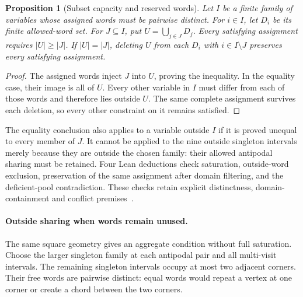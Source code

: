 \documentclass[11pt,a4paper]{article}
\newtheorem{proposition}[theorem]{Proposition}
\theoremstyle{definition}
\theoremstyle{remark}
\begin{document}
\begin{proposition}[Subset capacity and reserved words]\label{prop:subset211}
Let $I$ be a finite family of variables whose assigned words must be
pairwise distinct. For $i\in I$, let $D_i$ be its finite allowed-word set.
For $J\subseteq I$, put $U=\bigcup_{j\in J}D_j$.
Every satisfying assignment requires $|U|\ge|J|$.
If $|U|=|J|$, deleting $U$ from each $D_i$ with $i\in I\setminus J$
preserves every satisfying assignment.
\end{proposition}
\begin{proof}
The assigned words inject $J$ into $U$, proving the inequality.
In the equality case, their image is all of $U$. Every other variable
in $I$ must differ from each of those words and therefore lies outside
$U$. The same complete assignment survives each deletion, so every
other constraint on it remains satisfied.
\end{proof}
The equality conclusion also applies to a variable outside $I$ if
it is proved unequal to every member of $J$. It cannot be applied to
the nine outside singleton intervals merely because they are outside
the chosen family: their allowed antipodal sharing must be retained.
Four Lean deductions check saturation, outside-word exclusion,
preservation of the same assignment after domain filtering, and the
deficient-pool contradiction. These checks retain explicit distinctness,
domain-containment and conflict premises~\cite{research211}.


\paragraph{Outside sharing when words remain unused.}
The same square geometry gives an aggregate condition without full
saturation. Choose the larger singleton family at each antipodal pair
and all multi-visit intervals. The remaining singleton intervals occupy
at most two adjacent corners. Their free words are pairwise distinct:
equal words would repeat a vertex at one corner or create a chord
between the two corners.
\end{document}
